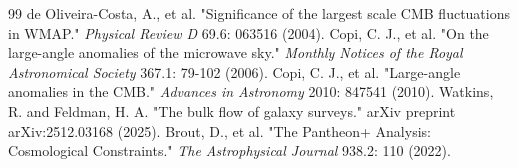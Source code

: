 \documentclass{article}
\begin{document}
\begin{thebibliography}{99}
 de Oliveira-Costa, A., et al. "Significance of the largest scale CMB fluctuations in WMAP." \textit{Physical Review D} 69.6: 063516 (2004).
 Copi, C. J., et al. "On the large-angle anomalies of the microwave sky." \textit{Monthly Notices of the Royal Astronomical Society} 367.1: 79-102 (2006).
 Copi, C. J., et al. "Large-angle anomalies in the CMB." \textit{Advances in Astronomy} 2010: 847541 (2010).
 Watkins, R. and Feldman, H. A. "The bulk flow of galaxy surveys." arXiv preprint arXiv:2512.03168 (2025).
 Brout, D., et al. "The Pantheon+ Analysis: Cosmological Constraints." \textit{The Astrophysical Journal} 938.2: 110 (2022).
\end{thebibliography}
\end{document}
